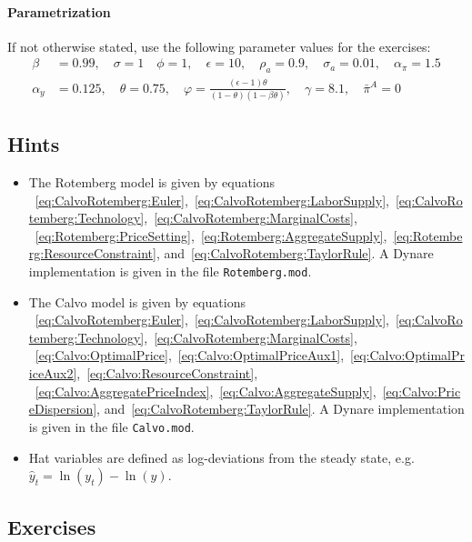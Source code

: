 \documentclass{article}
\numberwithin{equation}{section}
\begin{document}
\paragraph{Parametrization}
If not otherwise stated, use the following parameter values for the exercises:
\begin{align*}
\beta &= 0.99,\quad \sigma=1 \quad \phi=1, \quad \epsilon = 10, \quad \rho_a = 0.9, \quad \sigma_a = 0.01, \quad \alpha_\pi = 1.5
\\
\alpha_y &= 0.125,\quad \theta = 0.75, \quad \varphi = \frac{(\epsilon-1)\theta}{(1-\theta)(1-\beta\theta)}, \quad \gamma = 8.1, \quad \bar{\pi}^{A} = 0 
\end{align*}

\subsection*{Hints}
\begin{itemize}
\item The Rotemberg model is given by equations%
~\eqref{eq:CalvoRotemberg:Euler},~\eqref{eq:CalvoRotemberg:LaborSupply},~\eqref{eq:CalvoRotemberg:Technology},~\eqref{eq:CalvoRotemberg:MarginalCosts},%
~\eqref{eq:Rotemberg:PriceSetting},~\eqref{eq:Rotemberg:AggregateSupply},~\eqref{eq:Rotemberg:ResourceConstraint}, and~\eqref{eq:CalvoRotemberg:TaylorRule}.
A Dynare implementation is given in the file \texttt{Rotemberg.mod}.
\item The Calvo model is given by equations%
~\eqref{eq:CalvoRotemberg:Euler},~\eqref{eq:CalvoRotemberg:LaborSupply},~\eqref{eq:CalvoRotemberg:Technology},~\eqref{eq:CalvoRotemberg:MarginalCosts},%
~\eqref{eq:Calvo:OptimalPrice},~\eqref{eq:Calvo:OptimalPriceAux1},~\eqref{eq:Calvo:OptimalPriceAux2},~\eqref{eq:Calvo:ResourceConstraint},%
~\eqref{eq:Calvo:AggregatePriceIndex},~\eqref{eq:Calvo:AggregateSupply},~\eqref{eq:Calvo:PriceDispersion}, and~\eqref{eq:CalvoRotemberg:TaylorRule}.
A Dynare implementation is given in the file \texttt{Calvo.mod}.
\item Hat variables are defined as log-deviations from the steady state, e.g.
\(\hat{y}_t = \ln(y_t) - \ln(y)\).
\end{itemize}

\newpage

\subsection*{Exercises}
\end{document}
